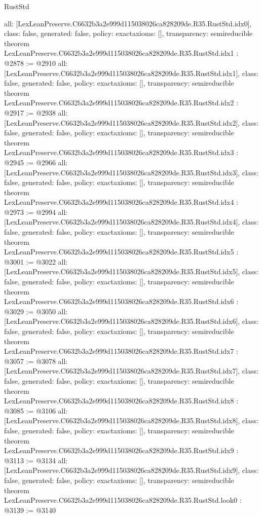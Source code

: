 \begin{lexlean}{RustStd}
\begin{coremodule}
{  all: [LexLeanPreserve.C6632b3a2e999d115038026ca828209de.R35.RustStd.idx0],
  class: false,
  generated: false,
  policy: exact{axioms: []},
  transparency: semireducible
}
theorem LexLeanPreserve.C6632b3a2e999d115038026ca828209de.R35.RustStd.idx1 : @2878 := @2910 {
  all: [LexLeanPreserve.C6632b3a2e999d115038026ca828209de.R35.RustStd.idx1],
  class: false,
  generated: false,
  policy: exact{axioms: []},
  transparency: semireducible
}
theorem LexLeanPreserve.C6632b3a2e999d115038026ca828209de.R35.RustStd.idx2 : @2917 := @2938 {
  all: [LexLeanPreserve.C6632b3a2e999d115038026ca828209de.R35.RustStd.idx2],
  class: false,
  generated: false,
  policy: exact{axioms: []},
  transparency: semireducible
}
theorem LexLeanPreserve.C6632b3a2e999d115038026ca828209de.R35.RustStd.idx3 : @2945 := @2966 {
  all: [LexLeanPreserve.C6632b3a2e999d115038026ca828209de.R35.RustStd.idx3],
  class: false,
  generated: false,
  policy: exact{axioms: []},
  transparency: semireducible
}
theorem LexLeanPreserve.C6632b3a2e999d115038026ca828209de.R35.RustStd.idx4 : @2973 := @2994 {
  all: [LexLeanPreserve.C6632b3a2e999d115038026ca828209de.R35.RustStd.idx4],
  class: false,
  generated: false,
  policy: exact{axioms: []},
  transparency: semireducible
}
theorem LexLeanPreserve.C6632b3a2e999d115038026ca828209de.R35.RustStd.idx5 : @3001 := @3022 {
  all: [LexLeanPreserve.C6632b3a2e999d115038026ca828209de.R35.RustStd.idx5],
  class: false,
  generated: false,
  policy: exact{axioms: []},
  transparency: semireducible
}
theorem LexLeanPreserve.C6632b3a2e999d115038026ca828209de.R35.RustStd.idx6 : @3029 := @3050 {
  all: [LexLeanPreserve.C6632b3a2e999d115038026ca828209de.R35.RustStd.idx6],
  class: false,
  generated: false,
  policy: exact{axioms: []},
  transparency: semireducible
}
theorem LexLeanPreserve.C6632b3a2e999d115038026ca828209de.R35.RustStd.idx7 : @3057 := @3078 {
  all: [LexLeanPreserve.C6632b3a2e999d115038026ca828209de.R35.RustStd.idx7],
  class: false,
  generated: false,
  policy: exact{axioms: []},
  transparency: semireducible
}
theorem LexLeanPreserve.C6632b3a2e999d115038026ca828209de.R35.RustStd.idx8 : @3085 := @3106 {
  all: [LexLeanPreserve.C6632b3a2e999d115038026ca828209de.R35.RustStd.idx8],
  class: false,
  generated: false,
  policy: exact{axioms: []},
  transparency: semireducible
}
theorem LexLeanPreserve.C6632b3a2e999d115038026ca828209de.R35.RustStd.idx9 : @3113 := @3134 {
  all: [LexLeanPreserve.C6632b3a2e999d115038026ca828209de.R35.RustStd.idx9],
  class: false,
  generated: false,
  policy: exact{axioms: []},
  transparency: semireducible
}
theorem LexLeanPreserve.C6632b3a2e999d115038026ca828209de.R35.RustStd.look0 : @3139 := @3140 {
}
\end{coremodule}
\end{lexlean}
